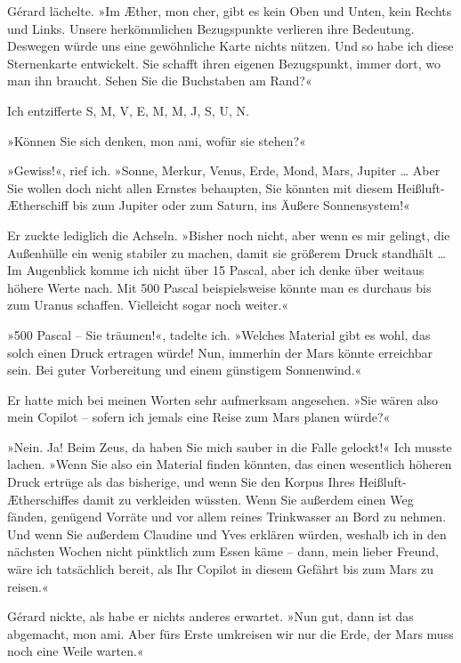 Gérard lächelte. »Im Æther, mon cher, gibt es kein Oben und Unten,
kein Rechts und Links. Unsere herkömmlichen Bezugspunkte verlieren
ihre Bedeutung. Deswegen würde uns eine gewöhnliche Karte nichts
nützen. Und so habe ich diese Sternenkarte entwickelt. Sie schafft
ihren eigenen Bezugspunkt, immer dort, wo man ihn braucht. Sehen
Sie die Buchstaben am Rand?«

Ich entzifferte S, M, V, E, M, M, J, S, U, N.

»Können Sie sich denken, mon ami, wofür sie stehen?«

»Gewiss!«, rief ich. »Sonne, Merkur, Venus, Erde, Mond, Mars,
Jupiter \ldots{} Aber Sie wollen doch nicht allen Ernstes behaupten, Sie
könnten mit diesem Heißluft-Ætherschiff bis zum Jupiter oder zum
Saturn, ins Äußere Sonnensystem!«

Er zuckte lediglich die Achseln. »Bisher noch nicht, aber wenn es
mir gelingt, die Außenhülle ein wenig stabiler zu machen, damit sie
größerem Druck standhält \ldots{} Im Augenblick komme ich nicht über 15
Pascal, aber ich denke über weitaus höhere Werte nach. Mit 500
Pascal beispielsweise könnte man es durchaus bis zum Uranus
schaffen. Vielleicht sogar noch weiter.«

»500 Pascal – Sie träumen!«, tadelte ich. »Welches Material gibt es
wohl, das solch einen Druck ertragen würde! Nun, immerhin der Mars
könnte erreichbar sein. Bei guter Vorbereitung und einem günstigem
Sonnenwind.«

Er hatte mich bei meinen Worten sehr aufmerksam angesehen. »Sie
wären also mein Copilot – sofern ich jemals eine Reise zum Mars
planen würde?«

»Nein. Ja! Beim Zeus, da haben Sie mich sauber in die Falle
gelockt!« Ich musste lachen. »Wenn Sie also ein Material finden
könnten, das einen wesentlich höheren Druck ertrüge als das
bisherige, und wenn Sie den Korpus Ihres Heißluft-Ætherschiffes
damit zu verkleiden wüssten. Wenn Sie außerdem einen Weg fänden,
genügend Vorräte und vor allem reines Trinkwasser an Bord zu
nehmen. Und wenn Sie außerdem Claudine und Yves erklären würden,
weshalb ich in den nächsten Wochen nicht pünktlich zum Essen käme –
dann, mein lieber Freund, wäre ich tatsächlich bereit, als Ihr
Copilot in diesem Gefährt bis zum Mars zu reisen.«

Gérard nickte, als habe er nichts anderes erwartet. »Nun gut, dann
ist das abgemacht, mon ami. Aber fürs Erste umkreisen wir nur die
Erde, der Mars muss noch eine Weile warten.«

\bigpar

